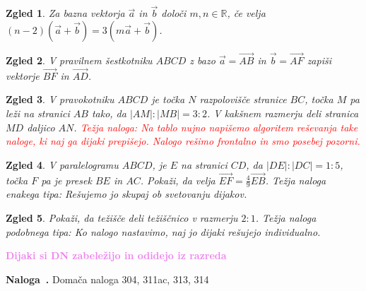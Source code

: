 \documentclass{article}
\newcounter{example}[section]
\newenvironment{example}[1][]{\refstepcounter{example}\par\medskip
   \noindent \textbf{Naloga~\theexample. #1} \rmfamily}{\medskip}
\newtheorem*{zgled}{Zgled}
\begin{document}
\begin{zgled}
    Za bazna vektorja $\vec{a}$ in $\vec{b}$ določi $m,n\in\mathbb{R}$, če velja $(n-2)(\vec{a}+\vec{b})=3(m\vec{a}+\vec{b})$.
\end{zgled}

\begin{zgled}
    V pravilnem šestkotniku $ABCD$ z bazo $\vec{a}=\vec{AB}$ in $\vec{b}=\vec{AF}$ zapiši vektorje $\vec{BF}$ in $\vec{AD}$.
\end{zgled}

\begin{zgled}
    V pravokotniku $ABCD$ je točka $N$ razpolovišče stranice $BC$, točka $M$ pa leži na stranici $AB$ tako, da $|AM|:|MB|=3:2$. V kakšnem razmerju deli stranica $MD$ daljico $AN$. \textcolor{red}{Težja naloga: Na tablo nujno napišemo algoritem reševanja take naloge, ki naj ga dijaki prepišejo. Nalogo rešimo frontalno in smo posebej pozorni.}
\end{zgled}

\begin{zgled}
    V paralelogramu $ABCD$, je $E$ na stranici $CD$, da $|DE|:|DC|=1:5$, točka $F$ pa je presek $BE$ in $AC$. Pokaži, da velja $\vec{EF}=\frac{4}{9}\vec{EB}$. {Težja naloga enakega tipa: Rešujemo jo skupaj ob svetovanju dijakov.}
\end{zgled}

\begin{zgled}
    Pokaži, da težišče deli težiščnico v razmerju $2:1$. {Težja naloga podobnega tipa: Ko nalogo nastavimo, naj jo dijaki rešujejo individualno.}
\end{zgled}

\textbf{\textcolor{violet}{Dijaki si DN zabeležijo in odidejo iz razreda}}

\begin{example}
    Domača naloga 304, 311ac, 313, 314
\end{example}
\end{document}
